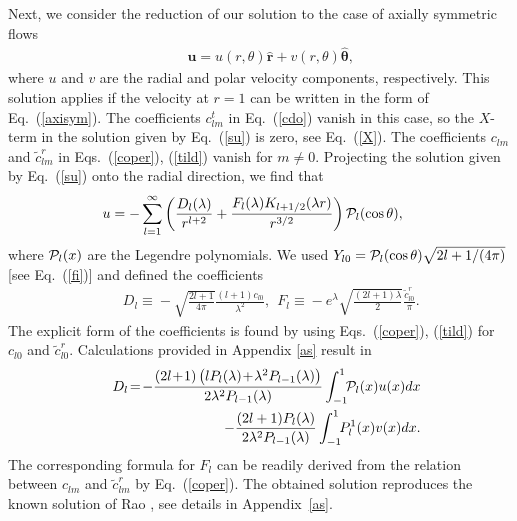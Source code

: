 \documentclass[aps,prx,twocolumn,amsmath,amssymb,amsfonts]{revtex4-2}
\begin{document}
{Next, we consider the reduction of our solution to the case of axially symmetric flows
\begin{eqnarray}&&\!\!\!\!\!\!\!
\bm u\!=\!u(r, \theta)\bm {\hat r}\!+\!v(r, \theta)\bm {\hat \theta}, \label{axisym}
\end{eqnarray}
where $u$ and $v$ are the radial and polar velocity components, respectively. This solution applies if the velocity at $r\!=\!1$ can be written in the form of Eq.~(\ref{axisym}). The coefficients $c^t_{lm}$ in Eq.~(\ref{cdo})
vanish in this case, so the $X$-term in the solution given by Eq.~(\ref{su}) is zero, see Eq.~(\ref{X}). The coefficients $c_{lm}$ and ${\tilde c}^{r}_{lm}$ in Eqs.~(\ref{coper}), (\ref{tild}) vanish for $m\neq 0$. Projecting the solution given by Eq.~(\ref{su}) onto the radial direction, we find that
\begin{eqnarray}&&\!\!\!\!\!\!\!\!\!\!\!\!
u=-\sum_{l=1}^{\infty}\left(\frac{D_l(\lambda)}{r^{l+2}}+\frac{F_l(\lambda)K_{l+1/2}(\lambda r)}{r^{3/2}} \right)
{\cal P}_l(\cos\theta),\label{axs}
\end{eqnarray}
where ${\cal P}_l(x)$ are the Legendre polynomials. We used $Y_{l0}={\cal P}_l(\cos\theta)\sqrt{2l+1/(4\pi)}$ [see Eq.~(\ref{fi})] and
defined the coefficients
\begin{eqnarray}&&\!\!\!\!\!\!\!\!\!\!\!\!\!\!\!
D_l\!\equiv\! -\sqrt{\frac{2l\!+\!1}{4\pi}}\frac{(l\!+\!1)c_{l0}}{\lambda^2},\ \ %
F_l\!\equiv \!-e^{\lambda}\sqrt{\frac{(2l\!+\!1)\lambda}{2}}\frac{ {\tilde c}^{r}_{l0}}{\pi}. \label{Dl}
\end{eqnarray}
The explicit form of the coefficients is found by using Eqs.~(\ref{coper}), (\ref{tild}) for $c_{l0}$ and ${\tilde c}^{r}_{l0}$. Calculations provided in Appendix \ref{as} result in
\begin{eqnarray}&&
D_l\!=\! -\frac{(2l\!+\!1)\left(l P_l(\lambda)
\!+\!\lambda^2 P_{l-1}(\lambda)\right)}{2\lambda^2 P_{l-1}(\lambda)}\int_{-1}^1\!\!  {\cal P}_l(x)  u(x) dx
\nonumber\\&&
-\frac{(2l+1)P_l(\lambda)}{2\lambda^2 P_{l-1}(\lambda)}\int_{-1}^1\!\!  P_l^1(x)  v(x) dx.\label{dl}
\end{eqnarray}
The corresponding formula for $F_l$ can be readily derived from the relation between $c_{lm}$ and ${\tilde c}^{r}_{lm}$ by Eq.~(\ref{coper}). The obtained solution reproduces the known solution of Rao \cite{rao}, see details in Appendix~\ref{as}.

}
\end{document}
